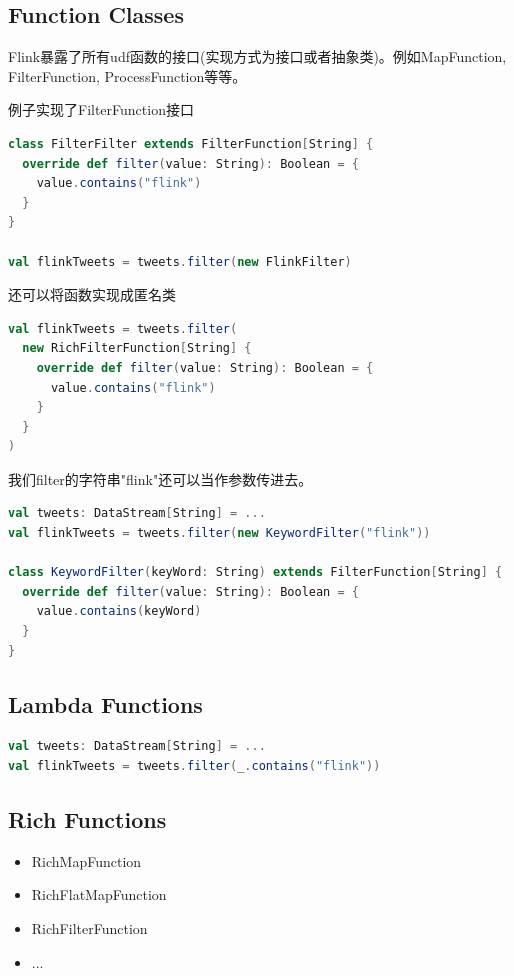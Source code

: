 \documentclass[oneside]{ctexbook}
\begin{document}
\subsection{Function Classes}

Flink暴露了所有udf函数的接口(实现方式为接口或者抽象类)。例如MapFunction, FilterFunction, ProcessFunction等等。

例子实现了FilterFunction接口

\begin{lstlisting}[language=scala, breaklines]
class FilterFilter extends FilterFunction[String] {
  override def filter(value: String): Boolean = {
    value.contains("flink")
  }
}

val flinkTweets = tweets.filter(new FlinkFilter)
\end{lstlisting}

还可以将函数实现成匿名类

\begin{lstlisting}[language=scala, breaklines]
val flinkTweets = tweets.filter(
  new RichFilterFunction[String] {
    override def filter(value: String): Boolean = {
      value.contains("flink")
    }
  }
)
\end{lstlisting}

我们filter的字符串"flink"还可以当作参数传进去。

\begin{lstlisting}[language=scala, breaklines]
val tweets: DataStream[String] = ...
val flinkTweets = tweets.filter(new KeywordFilter("flink"))

class KeywordFilter(keyWord: String) extends FilterFunction[String] {
  override def filter(value: String): Boolean = {
    value.contains(keyWord)
  }
}
\end{lstlisting}

\subsection{Lambda Functions}

\begin{lstlisting}[language=scala, breaklines]
val tweets: DataStream[String] = ...
val flinkTweets = tweets.filter(_.contains("flink"))
\end{lstlisting}

\subsection{Rich Functions}

\begin{itemize}
\item RichMapFunction
\item RichFlatMapFunction
\item RichFilterFunction
\item ...
\end{itemize}
\end{document}
